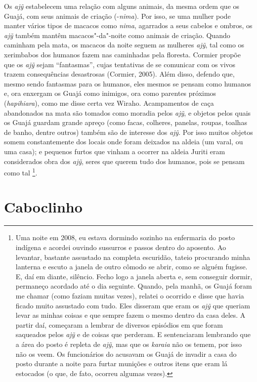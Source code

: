 Os \emph{ajỹ} estabelecem uma relação com alguns animais, da mesma ordem
que os Guajá, com seus animais de criação (-\emph{nima}). Por isso, se
uma mulher pode manter vários tipos de macacos como \emph{nima},
agarrados a seus cabelos e ombros, os \emph{ajỹ} também mantêm
macacos"-da"-noite como animais de criação. Quando caminham pela mata, os
macacos da noite seguem as mulheres \emph{ajỹ}, tal como os xerimbabos
dos humanos fazem nas caminhadas pela floresta. Cormier propõe que os
\emph{ajỹ} sejam ``fantasmas'', cujas tentativas de se comunicar com os
vivos trazem consequências desastrosas (Cormier, 2005). Além disso,
defendo que, mesmo sendo fantasmas para os humanos, eles mesmos se
pensam como humanos e, ora enxergam os Guajá como inimigos, ora como
parentes próximos (\emph{hapihiara}), como me disse certa vez Wiraho.
Acampamentos de caça abandonados na mata são tomados como moradia pelos
\emph{ajỹ}, e objetos pelos quais os Guajá guardam grande apreço (como
facas, colheres, panelas, roupas, toalhas de banho, dentre outros)
também são de interesse dos \emph{ajỹ}. Por isso muitos objetos somem
constantemente dos locais onde foram deixados na aldeia (um varal, ou
uma casa); e pequenos furtos que vinham a ocorrer na aldeia Juriti eram
considerados obra dos \emph{ajỹ}, seres que querem tudo dos humanos,
pois se pensam como tal \footnote{Uma noite em 2008, eu estava dormindo
  sozinho na enfermaria do posto indígena e acordei ouvindo sussurros e
  passos dentro do aposento. Ao levantar, bastante assustado na completa
  escuridão, tateio procurando minha lanterna e escuto a janela de outro
  cômodo se abrir, como se alguém fugisse. E, daí em diante, silêncio.
  Fecho logo a janela aberta e, sem conseguir dormir, permaneço acordado
  até o dia seguinte. Quando, pela manhã, os Guajá foram me chamar (como
  faziam muitas vezes), relatei o ocorrido e disse que havia ficado
  muito assustado com tudo. Eles disseram que eram os \emph{ajỹ} que
  queriam levar as minhas coisas e que sempre fazem o mesmo dentro da
  casa deles. A partir daí, começaram a lembrar de diversos episódios em
  que foram saqueados pelos \emph{ajỹ} e de coisas que perderam. E
  sentenciaram lembrando que a área do posto é repleta de \emph{ajỹ},
  mas que os \emph{karaia} não os temem, por isso não os veem. Os
  funcionários do  acusavam os Guajá de invadir a casa do posto
  durante a noite para furtar munições e outros itens que eram lá
  estocados (o que, de fato, ocorreu algumas vezes).}.

\section{Caboclinho}


